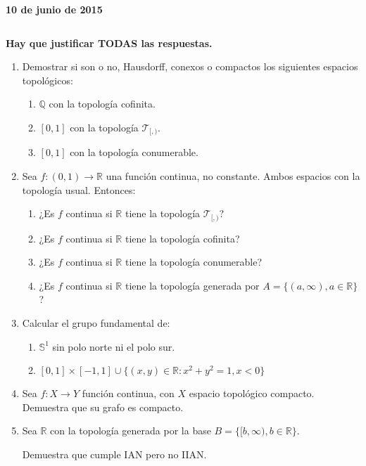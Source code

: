 \documentclass[12pt,spanish,a4paper]{article}
\newcommand{\real}[0]{\mathbb{R}}
\newcommand{\rac}[0]{\mathbb{Q}}
\newcommand{\topl}[0]{\mathcal{T}}
\newcommand{\sphere}[0]{\mathbb{S}}
\newcommand{\set}[1]{{\{ #1 \}}}
\newcommand{\appl}[3]{{{#1} : {#2} \rightarrow {#3}}}
\begin{document}

\hfill{\bf 10 de junio de 2015}

$ $

{\bf Hay que justificar TODAS las respuestas.}

\begin{enumerate}[label=\textbf{\arabic*.}]
	\item Demostrar si son o no, Hausdorff, conexos o compactos los siguientes espacios topológicos:
		\begin{enumerate}[label=\textbf{\alph*)}]
			\item $\rac$ con la topología cofinita.

			\item $[0,1]$ con la topología $\topl_{[,)}$.

			\item $[0,1]$ con la topología conumerable.

		\end{enumerate}

	\item Sea $\appl{f}{(0,1)}{\real}$ una función continua, no constante. Ambos espacios con la topología usual. Entonces:
		\begin{enumerate}[label=\textbf{\alph*})]
			\item ¿Es $f$ continua si $\real$ tiene la topología $\topl_{[,)}$?

			\item ¿Es $f$ continua si $\real$ tiene la topología cofinita?

			\item ¿Es $f$ continua si $\real$ tiene la topología conumerable?

			\item ¿Es $f$ continua si $\real$ tiene la topología generada por $A = \set{(a,\infty), a \in \real}$?

		\end{enumerate}

	\item Calcular el grupo fundamental de:
		\begin{enumerate}[label=\textbf{\alph*})]
			\item $\sphere^1$ sin polo norte ni el polo sur.

			\item $[0,1]\times[-1,1] \cup \set{(x,y) \in \real : x^2 + y^2 = 1, x < 0}$

		\end{enumerate}

	\item Sea $\appl{f}{X}{Y}$ función continua, con $X$ espacio topológico compacto. Demuestra que su grafo es compacto.

	\item Sea $\real$ con la topología generada por la base $B = \set{[b,\infty), b \in \real}$.

	Demuestra que cumple IAN pero no IIAN.

\end{enumerate}
\end{document}
